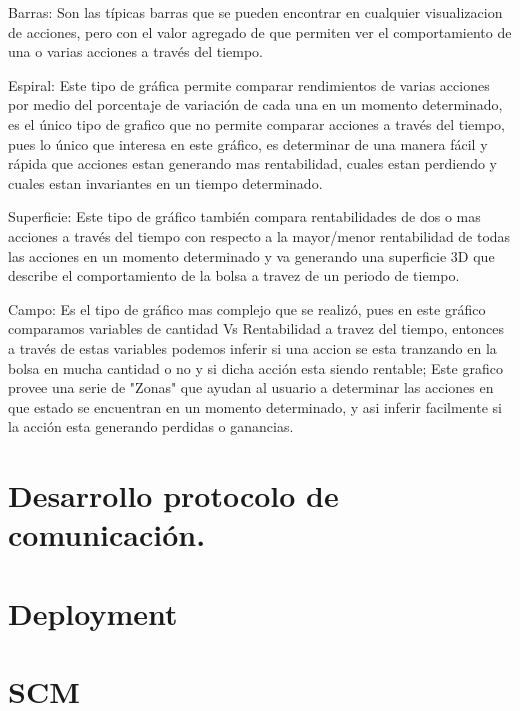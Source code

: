 Barras: Son las típicas barras que se pueden encontrar en cualquier visualizacion de acciones, pero con el valor agregado de que permiten ver el comportamiento de una o varias acciones a través del tiempo.

Espiral: Este tipo de gráfica permite comparar rendimientos de varias acciones por medio del porcentaje de variación de cada una en un momento determinado, es el único tipo de grafico que no permite comparar acciones a través del tiempo, pues lo único que interesa en este gráfico, es determinar de una manera fácil y rápida que acciones estan generando mas rentabilidad, cuales estan perdiendo y cuales estan invariantes en un tiempo determinado.

Superficie: Este tipo de gráfico también compara rentabilidades de dos o mas acciones a través del tiempo con respecto a la mayor/menor  rentabilidad de todas las acciones en un momento determinado  y va generando una superficie 3D que describe el comportamiento de la bolsa a travez de un periodo de tiempo.

Campo: Es el tipo de gráfico mas complejo que se realizó, pues en este gráfico comparamos variables de cantidad Vs Rentabilidad a travez del tiempo, entonces a través de estas variables podemos inferir si una accion se esta tranzando en la bolsa en mucha cantidad o no y si dicha acción esta siendo rentable; Este grafico provee una serie de "Zonas" que ayudan al usuario a determinar las acciones en que estado se encuentran en un momento determinado, y asi inferir facilmente si la acción esta generando perdidas o ganancias.

 

\section{Desarrollo protocolo de comunicación.}

\section{Deployment}

\section{SCM}